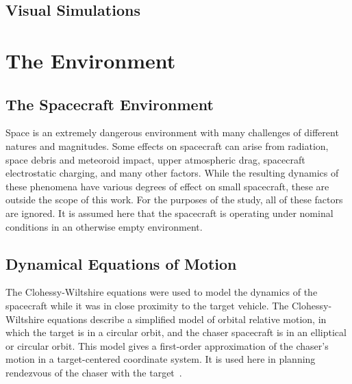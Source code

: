 \documentclass[journal, 10pt]{IEEEtran}
\begin{document}
\subsection{Visual Simulations}

\clearpage
\section{The Environment}
\subsection{The Spacecraft Environment}
Space is an extremely dangerous environment with many challenges of different natures and magnitudes. Some effects on spacecraft can arise from radiation, space debris and meteoroid impact, upper atmospheric drag, spacecraft electrostatic charging, and many other factors. While the resulting dynamics of these phenomena have various degrees of effect on small spacecraft, these are outside the scope of this work. For the purposes of the study, all of these factors are ignored. It is assumed here that the spacecraft is operating under nominal conditions in an otherwise empty environment.

\subsection{Dynamical Equations of Motion}
\label{cweqs}
The Clohessy-Wiltshire equations were used to model the dynamics of the spacecraft while it was in close proximity to the target vehicle. The Clohessy-Wiltshire equations describe a simplified model of orbital relative motion, in which the target is in a circular orbit, and the chaser spacecraft is in an elliptical or circular orbit. This model gives a first-order approximation of the chaser's motion in a target-centered coordinate system. It is used here in planning rendezvous of the chaser with the target~\cite{cw_eqs}.
\end{document}
